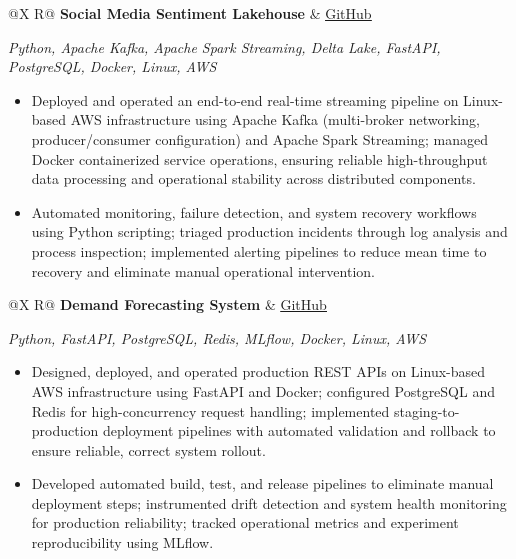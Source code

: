 \documentclass[a4paper,10pt]{article}
\newcommand{\ulink}[2]{\href{#1}{\uline{#2}}}
\newcommand{\subheading}[1]{{\color[HTML]{0A0A0A}\fontsize{12}{14}\selectfont\bfseries #1}}
\newcommand{\techstack}[1]{{\color[HTML]{5C5C5C}\fontsize{10.5}{12.5}\selectfont\itshape #1}}
\newcommand{\meta}[1]{{\color[HTML]{5C5C5C}\fontsize{10.5}{12.5}\selectfont #1}}
\begin{document}
\begin{tabularx}{\linewidth}{@{}X R@{}}
\subheading{Social Media Sentiment Lakehouse} & \meta{\ulink{https://github.com/su-jin1425/Social-Media-Sentiment-Lakehouse}{GitHub}}
\end{tabularx}
\vspace{1pt}
\techstack{Python, Apache Kafka, Apache Spark Streaming, Delta Lake, FastAPI, PostgreSQL, Docker, Linux, AWS}
\begin{itemize}[nosep, leftmargin=1.5em, itemsep=1pt, topsep=2pt]
\item {\color[HTML]{0A0A0A}\fontsize{11}{14}\selectfont
Deployed and operated an end-to-end real-time streaming pipeline on Linux-based AWS infrastructure using Apache Kafka (multi-broker networking, producer/consumer configuration) and Apache Spark Streaming; managed Docker containerized service operations, ensuring reliable high-throughput data processing and operational stability across distributed components.}
\item {\color[HTML]{0A0A0A}\fontsize{11}{14}\selectfont
Automated monitoring, failure detection, and system recovery workflows using Python scripting; triaged production incidents through log analysis and process inspection; implemented alerting pipelines to reduce mean time to recovery and eliminate manual operational intervention.}
\end{itemize}

\vspace{4pt}

\begin{tabularx}{\linewidth}{@{}X R@{}}
\subheading{Demand Forecasting System} & \meta{\ulink{https://github.com/su-jin1425/Demand-Forecasting-System}{GitHub}}
\end{tabularx}
\vspace{1pt}
\techstack{Python, FastAPI, PostgreSQL, Redis, MLflow, Docker, Linux, AWS}
\begin{itemize}[nosep, leftmargin=1.5em, itemsep=1pt, topsep=2pt]
\item {\color[HTML]{0A0A0A}\fontsize{11}{14}\selectfont
Designed, deployed, and operated production REST APIs on Linux-based AWS infrastructure using FastAPI and Docker; configured PostgreSQL and Redis for high-concurrency request handling; implemented staging-to-production deployment pipelines with automated validation and rollback to ensure reliable, correct system rollout.}
\item {\color[HTML]{0A0A0A}\fontsize{11}{14}\selectfont
Developed automated build, test, and release pipelines to eliminate manual deployment steps; instrumented drift detection and system health monitoring for production reliability; tracked operational metrics and experiment reproducibility using MLflow.}
\end{itemize}
\newpage
\vspace{4pt}
\end{document}
